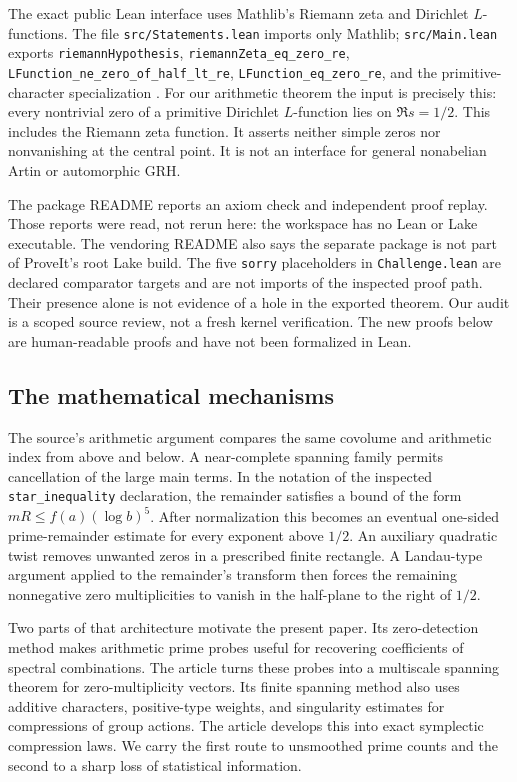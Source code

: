 \documentclass[11pt,letterpaper]{article}
\numberwithin{equation}{section}
\theoremstyle{definition}
\theoremstyle{remark}
\begin{document}
The exact public Lean interface uses Mathlib's Riemann zeta and Dirichlet
$L$-functions. The file \texttt{src/Statements.lean} imports only Mathlib;
\texttt{src/Main.lean} exports \texttt{riemannHypothesis},
\texttt{riemannZeta\_eq\_zero\_re},
\texttt{LFunction\_ne\_zero\_of\_half\_lt\_re},
\texttt{LFunction\_eq\_zero\_re}, and the primitive-character specialization
\cite{ProveItVendor}. For our arithmetic theorem the input is precisely this:
every nontrivial zero of a primitive Dirichlet $L$-function lies on
$\Re s=1/2$. This includes the Riemann zeta function. It asserts neither
simple zeros nor nonvanishing at the central point. It is not an interface
for general nonabelian Artin or automorphic GRH.

The package README reports an axiom check and independent proof replay.
Those reports were read, not rerun here: the workspace has no Lean or Lake
executable. The vendoring README also says the separate package is not part
of ProveIt's root Lake build. The five \texttt{sorry} placeholders in
\texttt{Challenge.lean} are declared comparator targets and are not imports
of the inspected proof path. Their presence alone is not evidence of a hole
in the exported theorem. Our audit is a scoped source review, not a fresh
kernel verification. The new proofs below are human-readable proofs and have
not been formalized in Lean.

\subsection{The mathematical mechanisms}
The source's arithmetic argument compares the same covolume and arithmetic
index from above and below. A near-complete spanning family permits
cancellation of the large main terms. In the notation of the inspected
\texttt{star\_inequality} declaration, the remainder satisfies a bound of
the form $mR\le f(a)(\log b)^5$. After normalization this becomes an eventual
one-sided prime-remainder estimate for every exponent above $1/2$.
An auxiliary quadratic twist removes unwanted zeros in a prescribed finite
rectangle. A Landau-type argument applied to the remainder's transform then
forces the remaining nonnegative zero multiplicities to vanish in the
half-plane to the right of $1/2$.

Two parts of that architecture motivate the present paper. Its zero-detection
method makes arithmetic prime probes useful for recovering coefficients of
spectral combinations. The article turns these probes into a multiscale
spanning theorem for zero-multiplicity vectors. Its finite spanning method
also uses additive characters, positive-type weights, and singularity
estimates for compressions of group actions. The article develops this into
exact symplectic compression laws. We carry the first route to unsmoothed
prime counts and the second to a sharp loss of statistical information.
\end{document}
